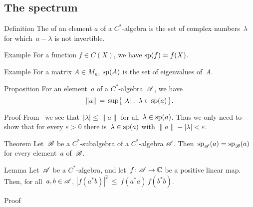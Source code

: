 \documentclass[main]{subfiles}
\begin{document}
%
%
\subsection{The spectrum}
\begin{parsec}%
\begin{point}{Definition}%
The  of an element $a$
of a $C^*$-algebra
is the set 
of complex numbers~$\lambda$
for which~$a-\lambda$ is not invertible.
\end{point}
\begin{point}{Example}%
For a function $f\in C(X)$,
we have $\mathrm{sp}(f) = f(X)$.
\end{point}
\begin{point}{Example}%
For a matrix $A\in M_n$,
$\mathrm{sp}(A)$ is the set of eigenvalues of~$A$.
\end{point}
\end{parsec}
%
%
%
\begin{parsec}%
\begin{point}{Proposition}%
For an element~$a$ of a $C^*$-algebra~$\mathscr{A}$,
we have
\begin{equation*}
\|a\|\,=\,\sup\{\,\left|\lambda\right|\colon \,\lambda\in \mathrm{sp}(a)\,\}.
\end{equation*}
\end{point}
\begin{point}{Proof}%
From~
we see that~$|\lambda|\leq \|a\|$
for all~$\lambda\in\mathrm{sp}(a)$.
Thus we only need to show
that for every $\varepsilon>0$
there is~$\lambda\in\mathrm{sp}(a)$ with $\|a\|-|\lambda| <\varepsilon$.

\end{point}
\end{parsec}

\begin{parsec}%
\begin{point}{Theorem}%
Let~$\mathscr{B}$ be a $C^*$-subalgebra of a $C^*$-algebra $\mathscr{A}$.
Then~$\mathrm{sp}_{\mathscr{A}}(a)=\mathrm{sp}_{\mathscr{B}}(a)$
for every element~$a$ of~$\mathscr{B}$.
\end{point}
\end{parsec}



%
%
\begin{parsec}[cstar-cs]%
\begin{point}{Lemma}%
Let~$\mathscr{A}$ be a $C^*$-algebra,
and let~$f\colon \mathscr{A}\to \mathbb{C}$ be a positive linear map.\\
Then, for all~$a,b\in\mathscr{A}$,\quad
$\left|f(a^*b)\right|^2 \ \leq\ f(a^*a)\,f(b^*b)$.
\end{point}
\begin{point}{Proof}%
\end{point}
\end{parsec}
\end{document}
